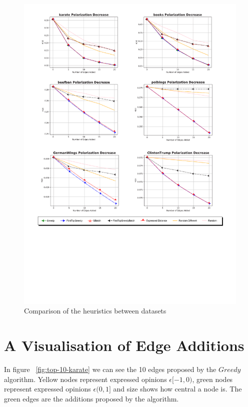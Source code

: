 \begin{figure}[!htbp]
	\begin{center}
	\advance\leftskip-1.3cm
	\captionsetup{justification=centering,margin=2cm}
	\includegraphics[width=1.2\textwidth]{Figures/heuristics}
	\caption{Comparison of the heuristics between datasets}
	\end{center}
	\label{heuristics_small}
\end{figure}
\clearpage
 
 \section{A Visualisation of Edge Additions}
\label{sec:vis}
In figure ~\ref{fig:top-10-karate} we can see the 10 edges proposed by the $Greedy$ algorithm. Yellow nodes represent expressed opinions $\epsilon [-1,0)$, green nodes represent expressed opinions $\epsilon (0,1]$ and size shows how central a node is. The green edges are the additions proposed by the algorithm.
\\

